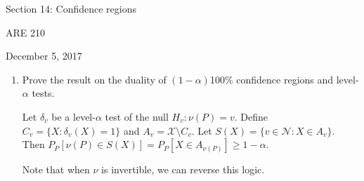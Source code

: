 \documentclass[12pt,english]{article}
\begin{document}
\begin{center}
{\Large{}Section 14: Confidence regions}
\par\end{center}{\Large \par}

\begin{center}
ARE 210
\par\end{center}

\begin{center}
December 5, 2017
\par\end{center}

\begin{enumerate}
	\item Prove the result on the duality of $(1 - \alpha)$100\% confidence regions and level-$\alpha$ tests.
	\vspace{1em}
	
	Let $\delta_{v}$ be a level-$\alpha$ test of the null $H_{v} : \nu(P) = v$. Define $C_{v} = \{ X : \delta_{v}(X) = 1 \}$ and $A_{v} = \mathcal{X} \setminus C_{v}$. Let $S(X) = \{ v \in \mathcal{N} : X \in A_{v} \}$. Then $P_{P}[\nu(P) \in S(X)] = P_{P}[X \in A_{\nu(P)}] \geq 1 - \alpha$.
	
	Note that when $\nu$ is invertible, we can reverse this logic.
	\vspace{1em}
\end{enumerate}
\end{document}

